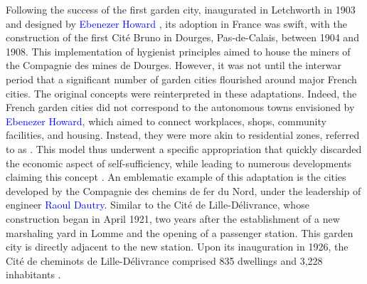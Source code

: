 \begin{refsegment}
Following the success of the first garden city, inaugurated in Letchworth in 1903 and designed by \textcolor{blue}{Ebenezer Howard} \textcolor{blue}{\autocite[9]{gaboriau_aux_2004}}, its adoption in France was swift, with the construction of the first Cité Bruno in Dourges, Pas-de-Calais, between 1904 and 1908. This implementation of hygienist principles aimed to house the miners of the Compagnie des mines de Dourges. However, it was not until the interwar period that a significant number of garden cities flourished around major French cities. The original concepts were reinterpreted in these adaptations. Indeed, the French garden cities did not correspond to the autonomous towns envisioned by \textcolor{blue}{Ebenezer Howard}, which aimed to connect workplaces, shops, community facilities, and housing. Instead, they were more akin to residential zones, referred to as . This model thus underwent a specific appropriation that quickly discarded the economic aspect of self-sufficiency, while leading to numerous developments claiming this concept \textcolor{blue}{\autocite[238]{guelton_cite-jardin_2013}}. An emblematic example of this adaptation is the cities developed by the Compagnie des chemins de fer du Nord, under the leadership of engineer \textcolor{blue}{Raoul Dautry}. Similar to the Cité de Lille-Délivrance, whose construction began in April 1921, two years after the establishment of a new marshaling yard in Lomme and the opening of a passenger station. This garden city is directly adjacent to the new station. Upon its inauguration in 1926, the Cité de cheminots de Lille-Délivrance comprised 835 dwellings and 3,228 inhabitants \textcolor{blue}{\autocite[19]{gaboriau_aux_2004}}.%


\end{refsegment}
